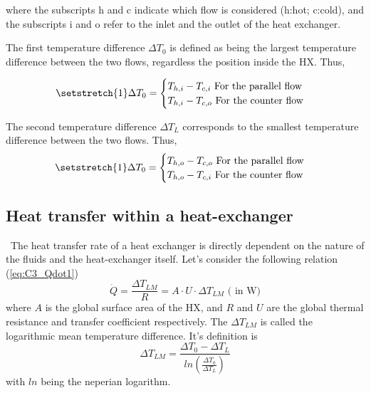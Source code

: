 where the subscripts h and c indicate which flow is considered (h:hot; c:cold), and the subscripts i and o refer to the inlet and the outlet of the heat exchanger.

The first temperature difference $\Delta T_0$ is defined as being the largest temperature difference between the two flows, regardless the position inside the HX. Thus,

\begin{equation}
\setstretch{1}
\Delta T_0 =
\begin{cases}
T_{h,i} - T_{c,i} \text{ For the parallel flow}\\
T_{h,i} - T_{c,o} \text{ For the counter flow}\\
\end{cases}\label{eq:C3_DT0}
\end{equation}

The second temperature difference $\Delta T_L$ corresponds to the smallest temperature difference between the two flows. Thus,
\begin{equation}
\setstretch{1}
\Delta T_0 =
\begin{cases}
T_{h,o} - T_{c,o} \text{ For the parallel flow}\\
T_{h,o} - T_{c,i} \text{ For the counter flow}\\
\end{cases}\label{eq:C3_DTL}
\end{equation}

\subsection{Heat transfer within a heat-exchanger}
\quad\, The heat transfer rate of a heat exchanger is directly dependent on the nature of the fluids and the heat-exchanger itself. Let's consider the following relation (\ref{eq:C3_Qdot1})
\begin{equation}
\dot{Q} = \frac{\Delta T_{LM}}{R}= A\cdot U\cdot \Delta T_{LM}\text{ ( in W)}\label{eq:C3_Qdot1}
\end{equation}
where $A$ is the global surface area of the HX, and $R$ and $U$ are the global thermal resistance and transfer coefficient respectively. The $\Delta T_{LM}$ is called the logarithmic mean temperature difference. It's definition is
\begin{equation}
\Delta T_{LM} = \frac{\Delta T_0-\Delta T_L}{ln\left(\frac{\Delta T_0}{\Delta T_L}\right)}\label{eq:C3_lmtd}
\end{equation} 
with $ln$ being the neperian logarithm.
